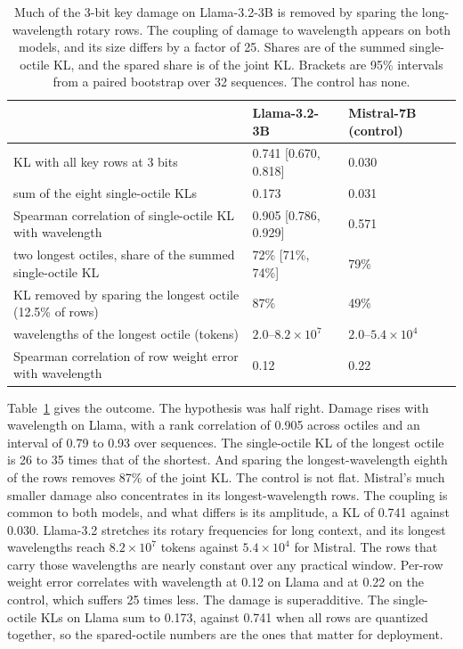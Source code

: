 \documentclass[journal]{IEEEtran}
\begin{document}
\begin{table}[t]
\centering
\caption{Much of the 3-bit key damage on Llama-3.2-3B is removed by sparing the
long-wavelength rotary rows. The coupling of damage to wavelength appears on both models, and its
size differs by a factor of 25. Shares are of the summed single-octile KL, and the spared share
is of the joint KL. Brackets are 95\% intervals from a paired bootstrap over 32 sequences. The
control has none.}
\label{tab:wave}
\small
\begin{tabular}{lll}
\toprule
 & Llama-3.2-3B & Mistral-7B (control) \\
\midrule
KL with all key rows at 3 bits & 0.741 [0.670, 0.818] & 0.030 \\
sum of the eight single-octile KLs & 0.173 & 0.031 \\
Spearman correlation of single-octile KL with wavelength & 0.905 [0.786, 0.929] & 0.571 \\
two longest octiles, share of the summed single-octile KL & 72\% [71\%, 74\%] & 79\% \\
KL removed by sparing the longest octile (12.5\% of rows) & 87\% & 49\% \\
wavelengths of the longest octile (tokens) & $2.0$--$8.2\times10^{7}$ & $2.0$--$5.4\times10^{4}$ \\
Spearman correlation of row weight error with wavelength & 0.12 & 0.22 \\
\bottomrule
\end{tabular}
\end{table}

Table~\ref{tab:wave} gives the outcome. The hypothesis was half right. Damage rises with
wavelength on Llama, with a rank correlation of 0.905 across octiles and an interval of 0.79 to
0.93 over sequences. The single-octile KL of the longest octile is 26 to 35 times that of the
shortest. And sparing the
longest-wavelength eighth of the rows removes 87\% of the joint KL. The control is not flat.
Mistral's much smaller damage also concentrates in its longest-wavelength rows. The coupling is
common to both models, and what differs is its amplitude, a KL of 0.741 against 0.030. Llama-3.2
stretches its rotary frequencies for long context, and its longest wavelengths reach
$8.2\times10^{7}$ tokens against $5.4\times10^{4}$ for Mistral. The rows that carry those
wavelengths are nearly constant over any practical window. Per-row weight error correlates with
wavelength at 0.12 on Llama and at 0.22 on the control, which suffers 25 times less. The damage is
superadditive. The single-octile KLs on Llama sum to 0.173, against 0.741 when all rows are
quantized together, so the spared-octile numbers are the ones that matter for deployment.
\end{document}
